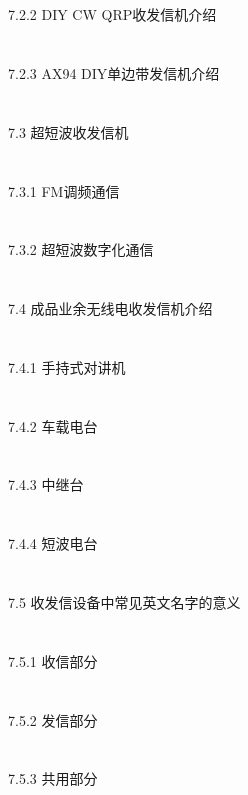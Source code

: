 \documentclass[12pt,UTF8]{ctexbook}
\begin{document}
\section{}7.2.2 DIY CW QRP收发信机介绍
\section{}7.2.3 AX94 DIY单边带发信机介绍
\section{}7.3 超短波收发信机
\section{}7.3.1 FM调频通信
\section{}7.3.2 超短波数字化通信
\section{}7.4 成品业余无线电收发信机介绍
\section{}7.4.1 手持式对讲机
\section{}7.4.2 车载电台
\section{}7.4.3 中继台
\section{}7.4.4 短波电台
\section{}7.5 收发信设备中常见英文名字的意义
\section{}7.5.1 收信部分
\section{}7.5.2 发信部分
\section{}7.5.3 共用部分
\end{document}
